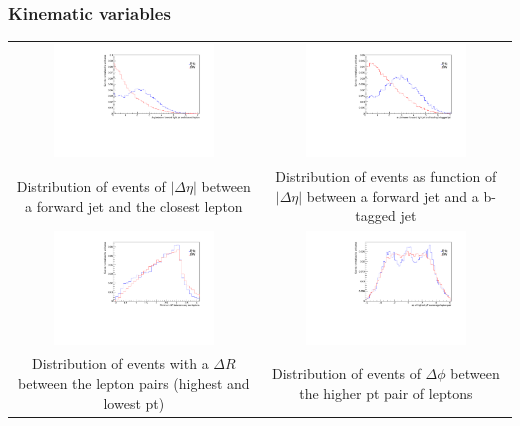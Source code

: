 \documentclass[11pt]{beamer}
\newcommand\Fontvi{\fontsize{4}{7.2}\selectfont}
\newcommand{\nologo}{\setbeamertemplate{logo}{}}
\begin{document}
{\nologo
	\begin{frame}
	\frametitle{Kinematic variables}
		\Fontvi
		\begin{center}
			\begin{tabular}{cc}
				\includegraphics[width=5.5cm,height=3cm]{figures/distributions/compare_variables-eta-fj-cl} &
				\includegraphics[width=5.5cm,height=3cm]{figures/distributions/compare_variables-eta-fj-b1}\\ 
				{Distribution of events of $|\Delta\eta|$ between a forward jet and the closest lepton} & {	Distribution of events as function of $|\Delta\eta|$ between a forward jet and a b-tagged jet } \\
				\includegraphics[width=5.5cm,height=3cm]{figures/distributions/compare_variables-dr}&
				\includegraphics[width=5.5cm,height=3cm]{figures/distributions/compare_variables-phi}\\
				{Distribution of events with a $\Delta R$ between the lepton pairs (highest and lowest pt)} & {Distribution of events of $\Delta\phi$ between the higher pt pair of leptons } \\
			\end{tabular}
		\end{center}
	\end{frame}
}
\end{document}
